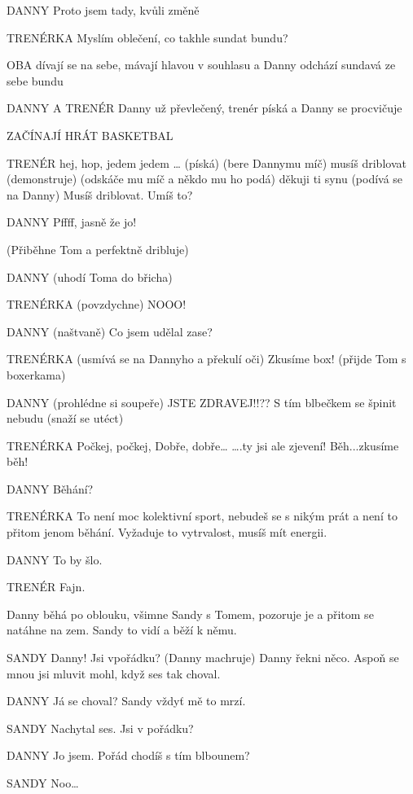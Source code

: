 DANNY        Proto jsem tady, kvůli změně 

TRENÉRKA        Myslím oblečení, co takhle sundat bundu?  

OBA        dívají se na sebe, mávají hlavou v souhlasu a Danny odchází sundavá        ze sebe bundu

DANNY A TRENÉR         Danny už převlečený, trenér píská a Danny se procvičuje

ZAČÍNAJÍ HRÁT BASKETBAL

TRENÉR        hej, hop, jedem jedem … (píská) (bere Dannymu míč) musíš driblovat         (demonstruje) (odskáče mu míč a někdo mu ho podá) děkuji ti synu                 (podívá se na Danny) Musíš driblovat. Umíš to?

DANNY        Pffff, jasně že jo!

(Přiběhne Tom a perfektně dribluje)

DANNY         (uhodí Toma do břicha)

TRENÉRKA        (povzdychne) NOOO!

DANNY          (naštvaně) Co jsem udělal zase?

TRENÉRKA         (usmívá se na Dannyho a překulí oči)    Zkusíme box! (přijde Tom s                 boxerkama)

DANNY         (prohlédne si soupeře) JSTE ZDRAVEJ!!?? S tím blbečkem se špinit                 nebudu (snaží se utéct)

TRENÉRKA          Počkej, počkej,  Dobře, dobře… ….ty jsi ale zjevení!  Běh...zkusíme běh!

DANNY        Běhání? 

TRENÉRKA          To není moc kolektivní sport, nebudeš se s nikým prát a není to přitom         jenom běhání. Vyžaduje to vytrvalost, musíš mít energii. 

DANNY        To by šlo. 

TRENÉR        Fajn. 

Danny běhá po oblouku, všimne Sandy s Tomem, pozoruje je a přitom se natáhne na zem. Sandy to vidí a běží k němu. 

SANDY        Danny! Jsi vpořádku? (Danny machruje) Danny řekni něco.  Aspoň se         mnou jsi mluvit mohl, když ses tak choval. 

DANNY        Já se choval? Sandy vždyť mě to mrzí. 

SANDY        Nachytal ses.  Jsi v pořádku? 

DANNY        Jo jsem. Pořád chodíš s tím blbounem? 

SANDY        Noo…

